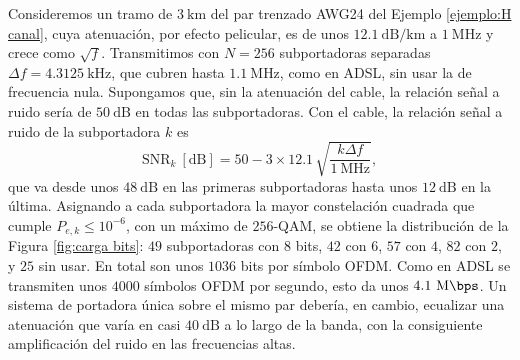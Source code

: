 \begin{ejemplo}\label{ejemplo:carga bits}
Consideremos un tramo de $3\ \unit{\kilo\meter}$ del par trenzado AWG24 del Ejemplo \ref{ejemplo:H canal}, cuya atenuación, por efecto pelicular, es de unos $12.1\ \unit{\deci\bel\per\kilo\meter}$ a $1\ \unit{\mega\hertz}$ y crece como $\sqrt f$. Transmitimos con $N=256$ subportadoras separadas $\Delta f=4.3125\ \unit{\kilo\hertz}$, que cubren hasta $1.1\ \unit{\mega\hertz}$, como en ADSL, sin usar la de frecuencia nula. Supongamos que, sin la atenuación del cable, la relación señal a ruido sería de $50\ \unit{\deci\bel}$ en todas las subportadoras. Con el cable, la relación señal a ruido de la subportadora $k$ es
\begin{equation*}
    \mathrm{SNR}_k\ [\unit{\deci\bel}] = 50 - 3\times 12.1\,\sqrt{\frac{k\Delta f}{1\ \unit{\mega\hertz}}},
\end{equation*}
que va desde unos $48\ \unit{\deci\bel}$ en las primeras subportadoras hasta unos $12\ \unit{\deci\bel}$ en la última. Asignando a cada subportadora la mayor constelación cuadrada que cumple $P_{e,k}\leqslant 10^{-6}$, con un máximo de $256$-QAM, se obtiene la distribución de la Figura \ref{fig:carga bits}: $49$ subportadoras con $8$ bits, $42$ con $6$, $57$ con $4$, $82$ con $2$, y $25$ sin usar. En total son unos $1036$ bits por símbolo OFDM. Como en ADSL se transmiten unos $4000$ símbolos OFDM por segundo, esto da unos $4.1\ \unit{\mega\bps}$. Un sistema de portadora única sobre el mismo par debería, en cambio, ecualizar una atenuación que varía en casi $40\ \unit{\deci\bel}$ a lo largo de la banda, con la consiguiente amplificación del ruido en las frecuencias altas.
\end{ejemplo}

